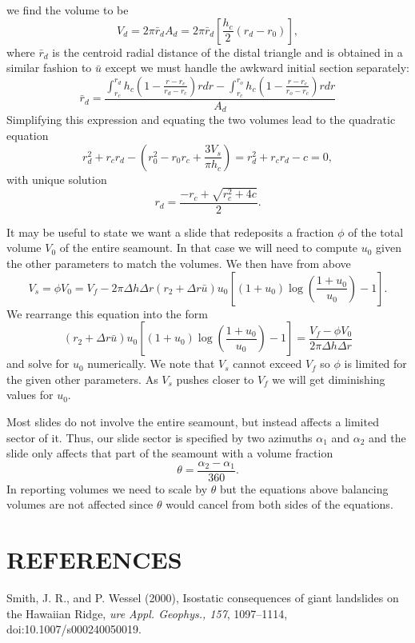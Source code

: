 \documentclass[12pt,letterpaper,margin=0.5in]{report}
\begin{document}
we find the volume to be
\begin{equation}
V_d = 2 \pi \bar{r}_d A_d = 2 \pi \bar{r}_d \left [ \frac{h_c}{2} (r_d - r_0) \right ],
\end{equation}
where $\bar{r}_d$ is the centroid radial distance of the distal triangle and is obtained in a similar fashion to $\bar{u}$ except
we must handle the awkward initial section separately:
\begin{equation}
\bar{r}_d = \frac{\int_{r_c}^{r_d}h_c \left (1 - \frac{r - r_c}{r_d - r_c} \right )rdr - \int_{r_c}^{r_o}h_c \left (1 - \frac{r - r_c}{r_o- r_c} \right )rdr}{A_d}
\end{equation}
Simplifying this expression and equating the two volumes lead to the quadratic equation
\begin{equation}
r_d^2 + r_c r_d - \left (r_0^2 - r_0 r_c + \frac{3 V_s}{\pi h_c}\right ) = r_d^2 + r_c r_d - c = 0,
\end{equation}
with unique solution
\begin{equation}
r_d = \frac{-r_c + \sqrt{r_c^2 + 4c}}{2}.
\end{equation}

It may be useful to state we want a slide that redeposits a fraction $\phi$ of the total volume $V_0$ of the entire seamount. In that
case we will need to compute $u_0$ given the other parameters to match the volumes.  We then have from above
\begin{equation}
V_s = \phi V_0 = V_f - 2 \pi \Delta h \Delta r \left ( r_2 + \Delta r\bar{u} \right ) u_0 \left [ (1 + u_0) \log \left (\frac{1 + u_0}{u_0} \right ) - 1 \right ].
\end{equation}
We rearrange this equation into the form
\begin{equation}
\left ( r_2 + \Delta r \bar{u} \right ) u_0 \left [ (1 + u_0) \log \left (\frac{1 + u_0}{u_0} \right ) - 1 \right ] = \frac{V_f - \phi V_0}{2 \pi \Delta h \Delta r}
\end{equation}
and solve for $u_0$ numerically.  We note that $V_s$ cannot exceed $V_f$ so $\phi$ is limited for the given other parameters.  As
$V_s$ pushes closer to $V_f$ we will get diminishing values for $u_0$.

Most slides do not involve the entire seamount, but instead affects a limited sector of it.  Thus, our slide sector is specified by two
azimuths $\alpha_1$ and $\alpha_2$ and the slide only affects that part of the seamount with a volume fraction
\begin{equation}
\theta = \frac{\alpha_2 - \alpha_1}{360}.
\end{equation}
In reporting volumes we need to scale by $\theta$ but the equations above balancing volumes are not affected since $\theta$ would cancel from both sides of the equations.

\section{REFERENCES}

Smith, J. R., and P. Wessel (2000), Isostatic consequences of giant landslides on the Hawaiian Ridge,
{\it ure Appl. Geophys., 157}, 1097--1114, doi:10.1007/s000240050019.
\end{document}
